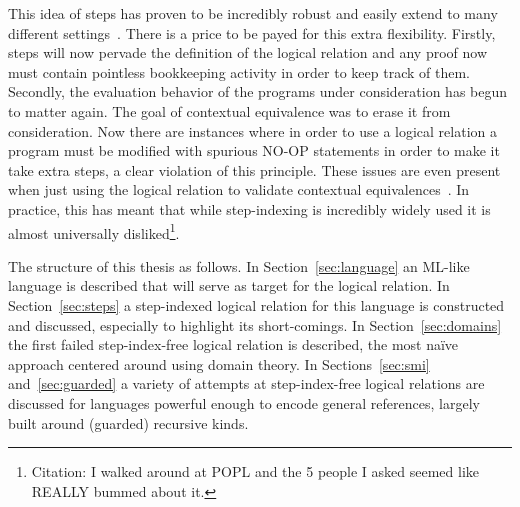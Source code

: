 This idea of steps has proven to be incredibly robust and easily
extend to many different
settings~\citep{Appel:01,Ahmed:04,Ahmed:06,Appel:07,Dreyer:09,Dreyer:10,Birkedal:steps:11,Turon:13,Svendsen:16}.
There is a price to be payed for this extra flexibility. Firstly,
steps will now pervade the definition of the logical relation and any
proof now must contain pointless bookkeeping activity in order to keep
track of them. Secondly, the evaluation behavior of the programs under
consideration has begun to matter again. The goal of contextual
equivalence was to erase it from consideration. Now there are
instances where in order to use a logical relation a program must be
modified with spurious NO-OP statements in order to make it take extra
steps, a clear violation of this principle. These issues are even
present when just using the logical relation to validate contextual
equivalences~\citep{Svendsen:16}. In practice, this has meant that
while step-indexing is incredibly widely used it is almost universally
disliked\footnote{Citation: I walked around at POPL and the 5 people I
  asked seemed like REALLY bummed about it.}.

The structure of this thesis as follows. In Section~\ref{sec:language}
an ML-like language is described that will serve as target for the
logical relation. In Section~\ref{sec:steps} a step-indexed logical
relation for this language is constructed and discussed, especially to
highlight its short-comings. In Section~\ref{sec:domains} the first
failed step-index-free logical relation is described, the most na\"ive
approach centered around using domain theory. In
Sections~\ref{sec:smi} and~\ref{sec:guarded} a variety of attempts at
step-index-free logical relations are discussed for languages powerful
enough to encode general references, largely built around (guarded)
recursive kinds.

